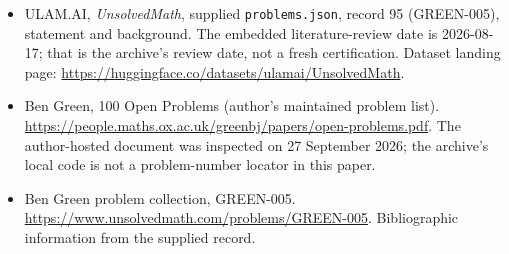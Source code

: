 \documentclass[11pt,a4paper]{article}
\begin{document}
{\small

\begin{itemize}

\item[\hypertarget{source:95:1}{S1}] ULAM.AI, \emph{UnsolvedMath}, supplied \texttt{problems.json}, record 95 (GREEN-005), statement and background. The embedded literature-review date is 2026-08-17; that is the archive’s review date, not a fresh certification. Dataset landing page: \url{https://huggingface.co/datasets/ulamai/UnsolvedMath}.

\item[\hypertarget{source:95:2}{S2}] Ben Green, 100 Open Problems (author’s maintained problem list). \url{https://people.maths.ox.ac.uk/greenbj/papers/open-problems.pdf}. The author-hosted document was inspected on 27 September 2026; the archive’s local code is not a problem-number locator in this paper.

\item[\hypertarget{source:95:3}{S3}] Ben Green problem collection, GREEN-005. \url{https://www.unsolvedmath.com/problems/GREEN-005}. Bibliographic information from the supplied record.

\end{itemize}

}

\label{end:95}
\end{document}
